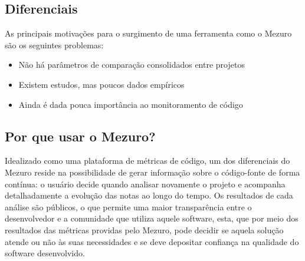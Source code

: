 \documentclass[10pt]{article}
\begin{document}
  \subsection{Diferenciais} \label{subsec:motivacao}
  As principais motivações para o surgimento de uma ferramenta como o Mezuro são os seguintes problemas:
  \begin{itemize}
      \item Não há parâmetros de comparação consolidados entre projetos
      \item Existem estudos, mas poucos dados empíricos
      \item Ainda é dada pouca importância ao monitoramento de código
  \end{itemize}
  \subsection{Por que usar o Mezuro?} \label{sec:projeto-mezuro}
  Idealizado como uma plataforma de métricas de código, um dos diferenciais do Mezuro reside na possibilidade de gerar informação sobre o código-fonte de forma contínua: o usuário decide quando analisar novamente o projeto e acompanha detalhadamente a evolução das notas ao longo do tempo. Os resultados de cada análise são públicos, o que permite uma maior transparência entre o desenvolvedor e a comunidade que utiliza aquele software, esta, que por meio dos resultados das métricas providas pelo Mezuro, pode decidir se aquela solução atende ou não às suas necessidades e se deve depositar confiança na qualidade do software desenvolvido.
\end{document}
